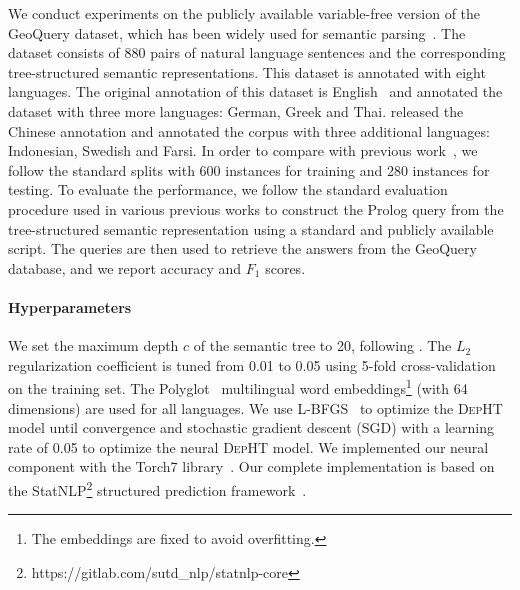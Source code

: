 We conduct experiments on the publicly available variable-free version of the GeoQuery dataset, which has been widely used for semantic parsing~\cite{wong2006learning,lu2008generative,jones2012semantic}. 
The dataset consists of 880 pairs of natural language sentences and the corresponding tree-structured semantic representations. 
This dataset is annotated with eight languages. 
The original annotation of this dataset is English~\cite{zelle1996learning} and \citet{jones2012semantic} annotated the dataset with three more languages: German, Greek and Thai. 
\citet{lu2011probabilistic} released the Chinese annotation and \citet{susanto2017semantic} annotated the corpus with three additional languages: Indonesian, Swedish and Farsi. 
In order to compare with previous work~\cite{jones2012semantic,lu2015constrained}, we follow the standard splits with 600 instances for training and 280 instances for testing. 
To evaluate the performance, we follow the standard evaluation procedure used in various previous works \cite{wong2006learning,lu2008generative,jones2012semantic,lu2015constrained} to construct the Prolog query from the tree-structured semantic representation using a standard and publicly available script. 
The queries are then used to retrieve the answers from the GeoQuery database, and we report  accuracy and $F_1$ scores.

\paragraph{Hyperparameters} 
We set the maximum depth $c$ of the semantic tree to 20, following \citet{lu2015constrained}. 
The $L_2$ regularization coefficient is tuned from 0.01 to 0.05 using 5-fold cross-validation on the training set.
The Polyglot~\cite{polyglot:2013:ACL-CoNLL} multilingual word embeddings\footnote{The embeddings are fixed to avoid overfitting.} (with 64 dimensions) are used for all languages.  
We use L-BFGS~\cite{liu1989limited} to optimize the \textsc{DepHT} model until convergence 
and stochastic gradient descent (SGD) with a learning rate of 0.05 to optimize the neural \textsc{DepHT} model.
We implemented our neural component with the Torch7 library~\cite{collobert2011torch7}. 
Our complete implementation is based on the StatNLP\footnote{https://gitlab.com/sutd\_nlp/statnlp-core} structured prediction framework~\cite{lu2017unified}. 



